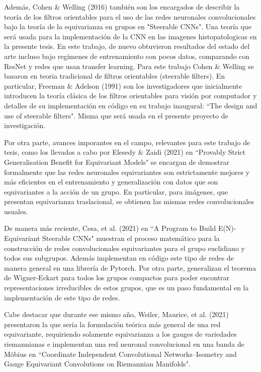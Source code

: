 \documentclass[12pt,letterpaper,final, openany]{scrbook}
\begin{document}
Además, Cohen \& Welling (2016) también son los encargados de describir la teoría de los filtros orientables para el uso de las redes neuronales convolucionales bajo la teoría de la equivarianza en grupos en "Steerable CNNs". Una teoría que será usada para la implementación de la CNN en las imagenes histopatologicas en la presente tesis. En este trabajo, de nuevo obtuvieron resultados del estado del arte incluso bajo regimenes de entrenamiento con pocos datos, comparando con ResNet y redes que usan transfer learning. Para este trabajo Cohen \& Welling se basaron en teoria tradicional de filtros orientables (steerable filters). En particular, Freeman \& Adelson (1991) son los investigadores que inicialmente introducen la teoría clásica de los filtros orientables para visión por computador y detalles de su implementación en código en su trabajo inaugural: ``The design and use of steerable filters". Misma que será usada en el presente proyecto de investigación.

Por otra parte, avances imporantes en el campo,  relevantes para este trabajo de tesis, como los llevados a cabo por Elesedy \& Zaidi (2021) en ``Provably Strict Generalisation Benefit for Equivariant Models" se encargan de demostrar formalmente que las redes neuronales equivariantes son estrictamente mejores y más eficientes en el entrenamiento y generalización con datos que son equivariantes a la acción de un grupo. En particular, para imágenes, que presentan equivarianza traslacional, se obtienen las mismas redes convolucionales usuales.

De manera más reciente, Cesa, et al. (2021) en ``A Program to Build E(N)-Equivariant Steerable CNNs" muestran el proceso matemático para la construcción de redes convolucionales equivariantes para el grupo euclidiano y todos sus subgrupos. Además implementan en código este tipo de redes de manera general en una librería de Pytorch. Por otra parte, generalizan el teorema de Wigner-Eckart para todos los grupos compactos para poder encontrar representaciones irreducibles de estos grupos, que es un paso fundamental en la implementación de este tipo de redes.

Cabe destacar que durante ese mismo año, Weiler, Maurice, et al. (2021) presentaron la que sería la formulación teórica más general de una red equivariante, requiriendo solamente equivarianza a los gauges de variedades riemannianas e implementan una red neuronal convolucional en una banda de Möbius en ``Coordinate Independent Convolutional Networks--Isometry and Gauge Equivariant Convolutions on Riemannian Manifolds".
\end{document}
